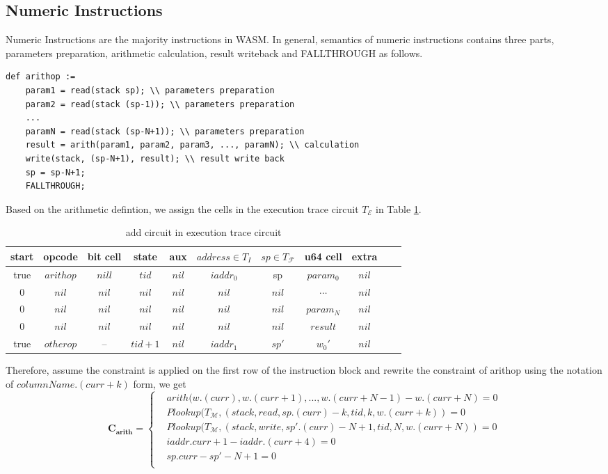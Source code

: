 \subsection{Numeric Instructions}
\label{chp:numeric-instruction}
Numeric Instructions are the majority instructions in WASM. In general, semantics of numeric instructions contains three parts, parameters preparation, arithmetic calculation, result writeback and FALLTHROUGH as follows.
\begin{verbatim}
def arithop :=
    param1 = read(stack sp); \\ parameters preparation
    param2 = read(stack (sp-1)); \\ parameters preparation
    ...
    paramN = read(stack (sp-N+1)); \\ parameters preparation
    result = arith(param1, param2, param3, ..., paramN); \\ calculation
    write(stack, (sp-N+1), result); \\ result write back
    sp = sp-N+1;
    FALLTHROUGH;
\end{verbatim}
Based on the arithmetic defintion, we assign the cells in the execution trace circuit $T_\mathcal{E}$ in Table \ref{tbl:arith-instruction}.
\begin{table}[!h]
\begin{center}
\begin{tabular}{ | c | c | c | c | c | c | c | c | c | c | c | }
  \hline
  start & opcode & bit cell & state & aux & $address \in T_{I}$ & $sp \in T_\mathcal{F}$& u64 cell & extra \\ 
  \hline
   true & $arithop$ & $nill$ & $tid$ & $nil$ & $iaddr_0$ & sp & $param_0$ & $nil$\\ 
 \hline
   0 & $nil$ & $nil$ & $nil$ & $nil$ & $nil$ & $nil$ & $\cdots$ & $nil$\\ 
 \hline
   0 & $nil$ & $nil$ & $nil$ & $nil$ & $nil$ & $nil$ & $param_N$ & $nil$\\ 
 \hline
   0 & $nil$ & $nil$ & $nil$ & $nil$ & $nil$ & $nil$ & $result$ & $nil$\\ 
 \hline
    true & $otherop$ & -- & $tid+1$ & $nil$ & $iaddr_1$ & $sp'$ & $w_0'$ & $nil$\\
 \hline
\end{tabular}
\caption{add circuit in execution trace circuit}
\label{tbl:arith-instruction}
\end{center}
\end{table}
Therefore, assume the constraint is applied on the first row of the instruction block and rewrite the constraint of arithop using the notation of $columnName.(curr+k)$ form, we get
\[
    \mathbf{C_{arith}} = \begin{cases}
        &arith(w.(curr), w.(curr+1), ..., w.(curr+N-1)-w.(curr+N) = 0 \\
        &Plookup(T_\mathcal{M}, (stack, read, sp.(curr)-k, tid, k, w.(curr+k)) = 0 \\
        &Plookup(T_\mathcal{M}, (stack, write, sp'.(curr)-N+1, tid, N, w.(curr+N)) = 0 \\
        &iaddr.curr + 1 - iaddr.(curr + 4) = 0\\
        &sp.curr - sp' - N + 1 = 0\\
    \end{cases}
\]

